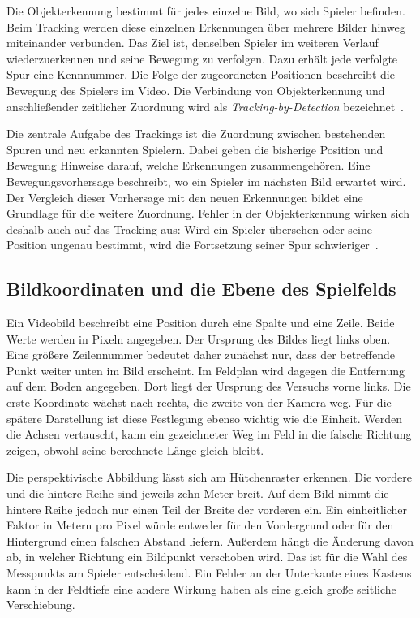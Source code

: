 Die Objekterkennung bestimmt für jedes einzelne Bild, wo sich Spieler
befinden. Beim Tracking werden diese einzelnen Erkennungen über mehrere
Bilder hinweg miteinander verbunden. Das Ziel ist, denselben Spieler im
weiteren Verlauf wiederzuerkennen und seine Bewegung zu verfolgen.
Dazu erhält jede verfolgte Spur eine Kennnummer. Die Folge der zugeordneten
Positionen beschreibt die Bewegung des Spielers im Video. Die Verbindung
von Objekterkennung und anschließender zeitlicher Zuordnung wird als
\emph{Tracking-by-Detection} bezeichnet~\cite{akpinar-bewley-sort}.

Die zentrale Aufgabe des Trackings ist die Zuordnung zwischen bestehenden
Spuren und neu erkannten Spielern. Dabei geben die bisherige Position und
Bewegung Hinweise darauf, welche Erkennungen zusammengehören. Eine
Bewegungsvorhersage beschreibt, wo ein Spieler im nächsten Bild erwartet
wird. Der Vergleich dieser Vorhersage mit den neuen Erkennungen bildet
eine Grundlage für die weitere Zuordnung. Fehler in der Objekterkennung
wirken sich deshalb auch auf das Tracking aus: Wird ein Spieler übersehen
oder seine Position ungenau bestimmt, wird die Fortsetzung seiner Spur schwieriger~\cite{akpinar-bewley-sort}.

\subsection{Bildkoordinaten und die Ebene des Spielfelds}
Ein Videobild beschreibt eine Position durch eine Spalte und eine Zeile. Beide Werte werden in Pixeln angegeben. Der Ursprung des Bildes liegt links oben. Eine größere Zeilennummer bedeutet daher zunächst nur, dass der betreffende Punkt weiter unten im Bild erscheint. Im Feldplan wird dagegen die Entfernung auf dem Boden angegeben. Dort liegt der Ursprung des Versuchs vorne links. Die erste Koordinate wächst nach rechts, die zweite von der Kamera weg. Für die spätere Darstellung ist diese Festlegung ebenso wichtig wie die Einheit. Werden die Achsen vertauscht, kann ein gezeichneter Weg im Feld in die falsche Richtung zeigen, obwohl seine berechnete Länge gleich bleibt.

Die perspektivische Abbildung lässt sich am Hütchenraster erkennen. Die vordere und die hintere Reihe sind jeweils zehn Meter breit. Auf dem Bild nimmt die hintere Reihe jedoch nur einen Teil der Breite der vorderen ein. Ein einheitlicher Faktor in Metern pro Pixel würde entweder für den Vordergrund oder für den Hintergrund einen falschen Abstand liefern. Außerdem hängt die Änderung davon ab, in welcher Richtung ein Bildpunkt verschoben wird. Das ist für die Wahl des Messpunkts am Spieler entscheidend. Ein Fehler an der Unterkante eines Kastens kann in der Feldtiefe eine andere Wirkung haben als eine gleich große seitliche Verschiebung.

